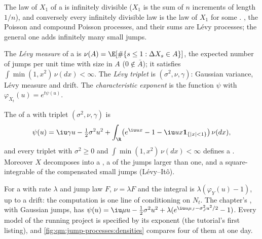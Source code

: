 The law of $X_1$ of a  is infinitely divisible ($X_1$ is the sum of $n$ increments of length
$1/n$), and conversely every infinitely divisible law is the law of $X_1$ for some . , the Poisson and compound Poisson processes, and their sums are Lévy processes; the
general one adds infinitely many small jumps.

\begin{definition}\label{def:qm:jump-processes:triplet}
The \emph{Lévy measure} of a  is $\nu(A) = \E[\#\{s \le 1 : \Delta X_s \in A\}]$,
the expected number of jumps per unit time with size in $A$ ($0 \notin \bar A$); it satisfies
$\int\min(1, x^2)\,\nu(dx) < \infty$. The \emph{Lévy triplet} is $(\sigma^2, \nu, \gamma)$:
Gaussian variance, Lévy measure and drift. The \emph{characteristic exponent} is the function $\psi$ with $\varphi_{X_t}(u) = e^{t\psi(u)}$.
\end{definition}

\begin{theorem}\label{thm:qm:jump-processes:lk}
The  of a  with triplet $(\sigma^2, \nu, \gamma)$ is
\[
\psi(u) = \iu\gamma u - \tfrac12\sigma^2u^2 + \int_{\R}\bigl(e^{\iu ux} - 1 - \iu ux\mathbf 1_{\{|x|<1\}}\bigr)\,\nu(dx),
\]
and every triplet with $\sigma^2 \ge 0$ and $\int\min(1, x^2)\,\nu(dx) < \infty$ defines a .
Moreover $X$ decomposes into a , a  of the jumps
larger than one, and a square-integrable  of the compensated small jumps (Lévy--Itô).
\end{theorem}

\admitted

For a  with rate $\lambda$ and jump law $F$, $\nu = \lambda F$ and the integral is
$\lambda(\varphi_Y(u) - 1)$, up to a drift: the computation is one line of conditioning on $N_t$. The chapter's
, with Gaussian jumps, has $\psi(u) = \iu\mu u - \tfrac12\sigma^2u^2 + \lambda(e^{\iu u\mu_J - \sigma_J^2u^2/2} -
1)$. Every model of the running project is specified by its exponent (the tutorial's first
listing), and \cref{fig:qm:jump-processes:densities} compares four of them at one day.

